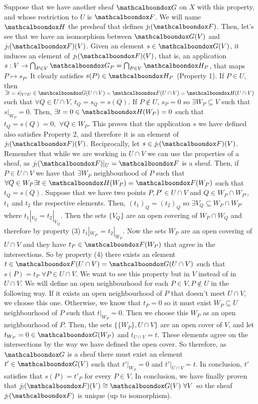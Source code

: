 \begin{sol}
\begin{enumerate}[label=\alph*)]
		Suppose that we have another sheaf $\sG$ on $X$ with this property, and whose restriction to $U$ is $\sF$. We will name $\sH$ the presheaf that defines $j_{!}(\sF)$. Then, let's see that we have an isomorphism between $\sG(V)$ and $j_{!}(\sF)(V)$. Given an element $s \in \sG(V)$, it induces an element of $j_{!}(\sF)(V)$, that is, an application $s: V \to \bigcap_{P \in V} \sG_P = \bigcap_{P \in V} \sH_P$, that maps $P \mapsto s_P$. It clearly satisfies $s(P) \in \sH_P$ (Property 1). If $P \in U$, then $\exists t = s|_{V \cap U} \in \sG(U \cap V) = \sF(U \cap V) = \sH(U \cap V)$ such that $\forall Q \in U \cap V, \, t_Q = s_Q = s(Q)$. If $P \notin U$, $s_P = 0$ so $\exists W_P \subseteq V$ such that $s|_{W_P} = 0$. Then, $\exists t = 0 \in \sH(W_P) = 0$ such that $t_Q = s(Q) = 0, \, \, \forall Q \in W_P$. This proves that the application $s$ we have defined also satisfies Property 2, and therefore it is an element of $j_{!}(\sF)(V)$. Reciprocally, let $s \in j_{!}(\sF)(V)$. Remember that while we are working in $U \cap V$ we can use the properties of a sheaf, as $j_{!}(\sF)|_U = \sF$ is a sheaf.  Then, if $P \in U \cap V$ we have that $\exists W_P$ neighbourhood of $P$ such that $\forall Q \in W_P \exists t \in \sH(W_P) = \sF(W_P)$ such that $t_Q = s(Q)$. Suppose that we have two points $P, P' \in U \cap V$ and $Q \in W_P \cap W_{P'}$, $t_1$ and $t_2$ the respective elements. Then, $(t_1)_Q = (t_2)_Q$ so $\exists V_{Q} \subseteq W_P \cap W_{P'}$ where $t_1|_{V_Q} = t_2|_{V_Q}$. Then the sets $\{V_Q\}$ are an open covering of $W_P \cap W_Q$ and therefore by property (3) $t_1|_{W_{P'}} = t_2|_{W_P}$. Now the sets $W_P$ are an open covering of $U \cap V$ and they have $t_P \in \sF(W_P)$ that agree in the intersections. So by property (4) there exists an element $t \in \sF(U \cap V) = \sG(U \cap V)$ such that $s(P) = t_P \, \, \forall P \in U \cap V$. We want to see this property but in $V$ instead of in $U \cap V$. We will define an open neighbourhood for each $P \in V, P \notin U$ in the following way. If it exists an open neighbourhood of $P$ that doesn't meet $U \cap V$, we choose this one. Otherwise, we know that $t_P = 0$ so it must exist $W_P \subseteq U$ neighbourhood of $P$ such that $t|_{W_P} = 0$. Then we choose this $W_P$ as an open neighbourhood of $P$. Then, the sets $\{\{W_P\}, U \cap V\}$ are an open cover of $V$, and let $t_{W_P} = 0 \in \sG(W_P)$ and $t_{U \cap V} = t$. These elements agree on the intersections by the way we have defined the open cover. So therefore, as $\sG$ is a sheaf there must exist an element $t' \in \sG(V)$ such that $t'|_{W_P} = 0$ and $t'|_{U \cap V} = t$. In conclusion, $t'$ satisfies that $s(P) = t'_{P}$ for every $P \in V$. In conclusion, we have finally proven that $j_{!}(\sF)(V) \cong \sG(V) \, \, \forall V$ so the sheaf $j_{!}(\sF)$ is unique (up to isomorphism).


\end{enumerate}
\end{sol}
